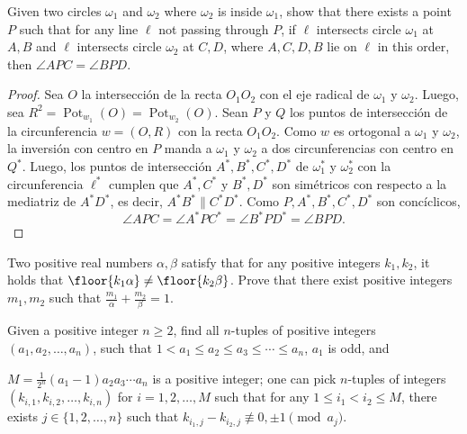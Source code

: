 \begin{probMG}
	Given two circles $\omega_1$ and $\omega_2$ where $\omega_2$ is inside $\omega_1$, show that there exists a point $P$ such that for any line $\ell$ not passing through $P$, if $\ell$ intersects circle $\omega_1$ at $A,B$ and $\ell$ intersects circle $\omega_2$ at $C,D$, where $A,C,D,B$ lie on $\ell$ in this order, then $\angle APC=\angle BPD$.
\end{probMG}

\begin{proof}
	Sea $O$ la intersección de la recta $O_1O_2$ con el eje radical de $\omega_1$ y $\omega_2$. Luego, sea $R^2=\operatorname{Pot}_{w_1}(O)=\operatorname{Pot}_{w_2}(O)$. Sean $P$ y $Q$ los puntos de intersección de la circunferencia $w=(O,R)$ con la recta $O_1O_2$. Como $w$ es ortogonal a $\omega_1$ y $\omega_2$, la inversión con centro en $P$ manda a $\omega_1$ y $\omega_2$ a dos circunferencias con centro en $Q^*$. Luego, los puntos de intersección $A^*,B^*,C^*,D^*$ de $\omega_1^*$ y $\omega_2^*$ con la circunferencia $\ell^*$ cumplen que $A^*,C^*$ y $B^*,D^*$ son simétricos con respecto a la mediatriz de $A^*D^*$, es decir, $A^*B^*\parallel C^*D^*$. Como $P,A^*,B^*,C^*,D^*$ son concíclicos,
	\[\angle APC=\angle A^*PC^*=\angle B^*PD^*=\angle BPD.\]
\end{proof}

\begin{probM}
	Two positive real numbers $\alpha,\beta$ satisfy that for any positive integers $k_1,k_2$, it holds that $\floor{k_1\alpha}\ne\floor{k_2\beta}$. Prove that there exist positive integers $m_1,m_2$ such that $\frac{m_1}{\alpha}+\frac{m_2}{\beta}=1$.
\end{probM}

\begin{probH}
	Given a positive integer $n\ge 2$, find all $n$-tuples of positive integers $(a_1,a_2,\dots,a_n)$, such that $1<a_1\le a_2\le a_3\le\cdots\le a_n$, $a_1$ is odd, and
	\begin{enumerate}[(1)]
		\ii $M=\frac{1}{2^n}(a_1-1)a_2a_3\cdots a_n$ is a positive integer;
		\ii one can pick $n$-tuples of integers $(k_{i,1},k_{i,2},\dots,k_{i,n})$ for $i=1,2,\dots,M$ such that for any $1\le i_1<i_2\le M$, there exists $j\in\{1,2,\dots,n\}$ such that $k_{i_1,j}-k_{i_2,j}\not\equiv 0,\pm 1\pmod{a_j}$.
	\end{enumerate}
\end{probH}

